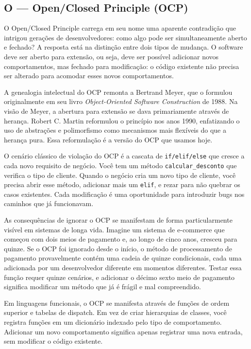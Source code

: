 \subsection{O --- Open/Closed Principle (OCP)}

O Open/Closed Principle carrega em seu nome uma aparente contradição que intrigou
gerações de desenvolvedores: como algo pode ser simultaneamente aberto e fechado?
A resposta está na distinção entre dois tipos de mudança. O software deve ser
aberto para extensão, ou seja, deve ser possível adicionar novos comportamentos,
mas fechado para modificação: o código existente não precisa ser alterado
para acomodar esses novos comportamentos.

A genealogia intelectual do OCP remonta a Bertrand Meyer, que o formulou
originalmente em seu livro \emph{Object-Oriented Software Construction} de
1988. Na visão de Meyer, a abertura para extensão se dava primariamente
através de herança. Robert C. Martin reformulou o princípio nos anos 1990,
enfatizando o uso de abstrações e polimorfismo como mecanismos mais flexíveis
do que a herança pura. Essa reformulação é a versão do OCP que usamos hoje.

O cenário clássico de violação do OCP é a cascata de \texttt{if/elif/else}
que cresce a cada novo requisito de negócio. Você tem um método
\texttt{calcular\_desconto} que verifica o tipo de cliente. Quando o negócio
cria um novo tipo de cliente, você precisa abrir esse método, adicionar mais
um \texttt{elif}, e rezar para não quebrar os casos existentes. Cada
modificação é uma oportunidade para introduzir bugs nos caminhos que já
funcionavam.

As consequências de ignorar o OCP se manifestam de forma particularmente
visível em sistemas de longa vida. Imagine um sistema de e-commerce que
começou com dois meios de pagamento e, ao longo de cinco anos, cresceu
para quinze. Se o OCP foi ignorado desde o início, o método de
processamento de pagamento provavelmente contém uma cadeia de quinze
condicionais, cada uma adicionada por um desenvolvedor diferente em
momentos diferentes. Testar essa função requer quinze cenários, e
adicionar o décimo sexto meio de pagamento significa modificar um método
que já é frágil e mal compreendido.

Em linguagens funcionais, o OCP se manifesta através de funções de ordem
superior e tabelas de dispatch. Em vez de criar hierarquias de classes,
você registra funções em um dicionário indexado pelo tipo de comportamento.
Adicionar um novo comportamento significa apenas registrar uma nova
entrada, sem modificar o código existente.

